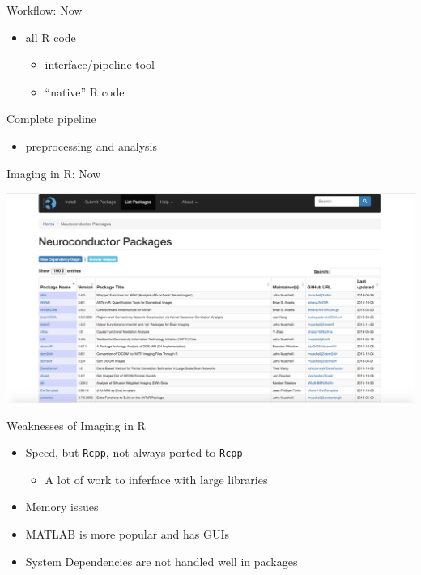 \documentclass[ignorenonframetext,]{beamer}
\providecommand{\tightlist}{%
  \setlength{\itemsep}{0pt}\setlength{\parskip}{0pt}}
\begin{document}
\begin{frame}[fragile]

\hypertarget{left_col2}{}
Workflow: Now

\begin{itemize}
\tightlist
\item
  all R code

  \begin{itemize}
  \tightlist
  \item
    interface/pipeline tool
  \item
    “native” R code
  \end{itemize}
\end{itemize}

Complete pipeline

\begin{itemize}
\tightlist
\item
  preprocessing and analysis
\end{itemize}

\hypertarget{right_col2}{}

\begin{block}{Imaging in R: Now}

\includegraphics[width=0.95\linewidth]{figure/neuroc}

\end{block}

\begin{block}{Weaknesses of Imaging in R}

\hypertarget{left_col}{}
\begin{itemize}
\tightlist
\item
  Speed, but \texttt{Rcpp}, not always ported to \texttt{Rcpp}

  \begin{itemize}
  \tightlist
  \item
    A lot of work to inferface with large libraries
  \end{itemize}
\item
  Memory issues
\item
  MATLAB is more popular and has GUIs
\item
  System Dependencies are not handled well in packages
\end{itemize}


\end{block}
\end{frame}
\end{document}

